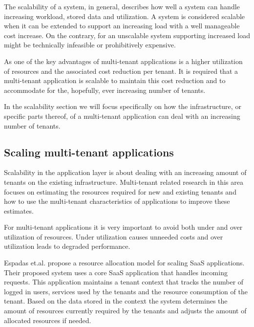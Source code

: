 The scalability of a system, in general, describes how well a system can handle increasing workload, stored data and utilization.
A system is considered scalable when it can be extended to support an increasing load with a well manageable cost increase.
On the contrary, for an unscalable system supporting increased load might be technically infeasible or prohibitively expensive.\cite{bondi2000scalability}

As one of the key advantages of multi-tenant applications is a higher utilization of resources and the associated cost reduction per tenant.\cite{bezemer2010multi} 
It is required that a multi-tenant application is scalable to maintain this cost reduction and to accommodate for the, hopefully, ever increasing number of tenants.

In the scalability section we will focus specifically on how the infrastructure, or specific parts thereof, of a multi-tenant application can deal with an increasing number of tenants.

\subsection{Scaling multi-tenant applications}
Scalability in the application layer is about dealing with an increasing amount of tenants on the existing infrastructure.
Multi-tenant related research in this area focuses on estimating the resources required for new and existing tenants and how to use the multi-tenant characteristics of applications to improve these estimates. 

For multi-tenant applications it is very important to avoid both under and over utilization of resources.
Under utilization causes unneeded costs and over utilization leads to degraded performance.

Espadas et.al. \cite{espadas2013tenant} propose a resource allocation model for scaling SaaS applications.
Their proposed system uses a core SaaS application that handles incoming requests.
This application maintains a tenant context that tracks the number of logged in users, services used by the tenants and the resource consumption of the tenant.
Based on the data stored in the context the system determines the amount of resources currently required by the tenants and adjusts the amount of allocated resources if needed.


